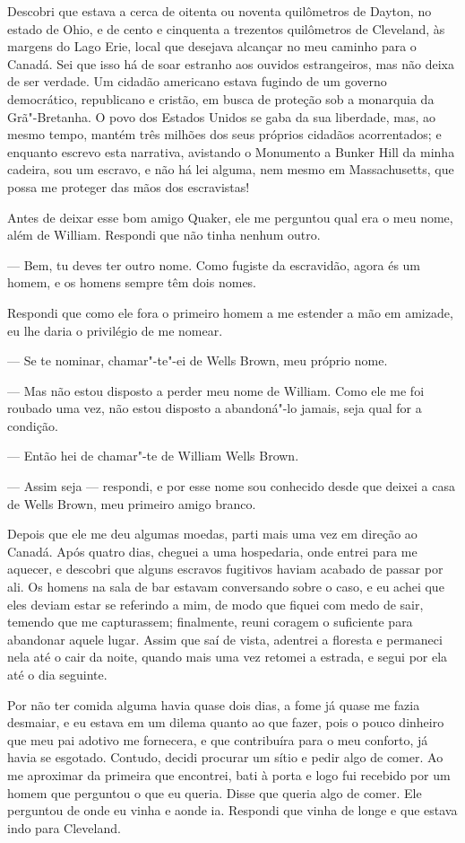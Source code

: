 Descobri que estava a cerca de oitenta ou noventa quilômetros de Dayton,
no estado de Ohio, e de cento e cinquenta a trezentos quilômetros de
Cleveland, às margens do Lago Erie, local que desejava alcançar no meu
caminho para o Canadá. Sei que isso há de soar estranho aos ouvidos
estrangeiros, mas não deixa de ser verdade. Um cidadão americano estava
fugindo de um governo democrático, republicano e cristão, em busca de
proteção sob a monarquia da Grã"-Bretanha. O povo dos Estados Unidos se
gaba da sua liberdade, mas, ao mesmo tempo, mantém três milhões dos seus
próprios cidadãos acorrentados; e enquanto escrevo esta narrativa,
avistando o Monumento a Bunker Hill da minha cadeira, sou um escravo, e
não há lei alguma, nem mesmo em Massachusetts, que possa me proteger das
mãos dos escravistas!

Antes de deixar esse bom amigo Quaker, ele me perguntou qual era o meu
nome, além de William. Respondi que não tinha nenhum outro.

--- Bem, tu deves ter outro nome. Como fugiste da escravidão, agora és
um homem, e os homens sempre têm dois nomes.

Respondi que como ele fora o primeiro homem a me estender a mão em
amizade, eu lhe daria o privilégio de me nomear.

--- Se te nominar, chamar"-te"-ei de Wells Brown, meu próprio nome.

--- Mas não estou disposto a perder meu nome de William. Como ele me foi
roubado uma vez, não estou disposto a abandoná"-lo jamais, seja qual for
a condição.

--- Então hei de chamar"-te de William Wells Brown.

--- Assim seja --- respondi, e por esse nome sou conhecido desde que
deixei a casa de Wells Brown, meu primeiro amigo branco.

Depois que ele me deu algumas moedas, parti mais uma vez em direção ao
Canadá. Após quatro dias, cheguei a uma hospedaria, onde entrei para me
aquecer, e descobri que alguns escravos fugitivos haviam acabado de
passar por ali. Os homens na sala de bar estavam conversando sobre o
caso, e eu achei que eles deviam estar se referindo a mim, de modo que
fiquei com medo de sair, temendo que me capturassem; finalmente, reuni
coragem o suficiente para abandonar aquele lugar. Assim que saí de
vista, adentrei a floresta e permaneci nela até o cair da noite, quando
mais uma vez retomei a estrada, e segui por ela até o dia seguinte.

Por não ter comida alguma havia quase dois dias, a fome já quase me
fazia desmaiar, e eu estava em um dilema quanto ao que fazer, pois o
pouco dinheiro que meu pai adotivo me fornecera, e que contribuíra para
o meu conforto, já havia se esgotado. Contudo, decidi procurar um sítio
e pedir algo de comer. Ao me aproximar da primeira que encontrei, bati à
porta e logo fui recebido por um homem que perguntou o que eu queria.
Disse que queria algo de comer. Ele perguntou de onde eu vinha e aonde
ia. Respondi que vinha de longe e que estava indo para Cleveland.

